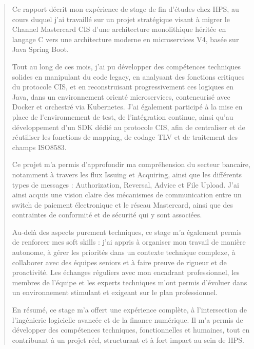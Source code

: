 \documentclass[12pt,a4paper]{report}
\begin{document}
\begin{quote}
Ce rapport décrit mon expérience de stage de fin d'études chez HPS, au
cours duquel j'ai travaillé sur un projet stratégique visant à migrer le
Channel Mastercard CIS d'une architecture monolithique héritée en
langage C vers une architecture moderne en microservices V4, basée sur
Java Spring Boot.

Tout au long de ces mois, j'ai pu développer des compétences techniques
solides en manipulant du code legacy, en analysant des fonctions
critiques du protocole CIS, et en reconstruisant progressivement ces
logiques en Java, dans un environnement orienté microservices,
conteneurisé avec Docker et orchestré via Kubernetes. J'ai également
participé à la mise en place de l'environnement de test, de
l'intégration continue, ainsi qu'au développement d'un SDK dédié au
protocole CIS, afin de centraliser et de réutiliser les fonctions de
mapping, de codage TLV et de traitement des champs ISO8583.

Ce projet m'a permis d'approfondir ma compréhension du secteur bancaire,
notamment à travers les flux Issuing et Acquiring, ainsi que les
différents types de messages : Authorization, Reversal, Advice et File
Upload. J'ai ainsi acquis une vision claire des mécanismes de
communication entre un switch de paiement électronique et le réseau
Mastercard, ainsi que des contraintes de conformité et de sécurité qui y
sont associées.

Au-delà des aspects purement techniques, ce stage m'a également permis
de renforcer mes soft skills : j'ai appris à organiser mon travail de
manière autonome, à gérer les priorités dans un contexte technique
complexe, à collaborer avec des équipes seniors et à faire preuve de
rigueur et de proactivité. Les échanges réguliers avec mon encadrant
professionnel, les membres de l'équipe et les experts techniques m'ont
permis d'évoluer dans un environnement stimulant et exigeant sur le plan
professionnel.

En résumé, ce stage m'a offert une expérience complète, à l'intersection
de l'ingénierie logicielle avancée et de la finance numérique. Il m'a
permis de développer des compétences techniques, fonctionnelles et
humaines, tout en contribuant à un projet réel, structurant et à fort
impact au sein de HPS.
\end{quote}
\clearpage
\end{document}
